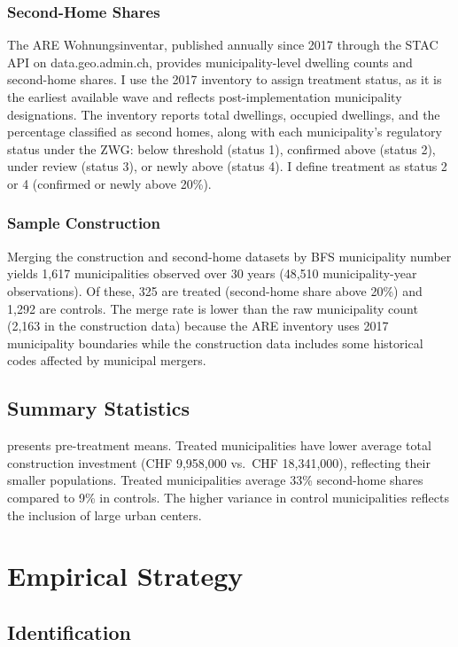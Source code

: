 \documentclass[12pt]{article}
\begin{document}
\subsubsection*{Second-Home Shares} The ARE Wohnungsinventar, published annually since 2017 through the STAC API on data.geo.admin.ch, provides municipality-level dwelling counts and second-home shares. I use the 2017 inventory to assign treatment status, as it is the earliest available wave and reflects post-implementation municipality designations. The inventory reports total dwellings, occupied dwellings, and the percentage classified as second homes, along with each municipality's regulatory status under the ZWG: below threshold (status 1), confirmed above (status 2), under review (status 3), or newly above (status 4). I define treatment as status 2 or 4 (confirmed or newly above 20\%).

\subsubsection*{Sample Construction} Merging the construction and second-home datasets by BFS municipality number yields 1,617 municipalities observed over 30 years (48,510 municipality-year observations). Of these, 325 are treated (second-home share above 20\%) and 1,292 are controls. The merge rate is lower than the raw municipality count (2,163 in the construction data) because the ARE inventory uses 2017 municipality boundaries while the construction data includes some historical codes affected by municipal mergers.

\subsection{Summary Statistics}



 presents pre-treatment means. Treated municipalities have lower average total construction investment (CHF 9,958,000 vs.\ CHF 18,341,000), reflecting their smaller populations. Treated municipalities average 33\% second-home shares compared to 9\% in controls. The higher variance in control municipalities reflects the inclusion of large urban centers.

\section{Empirical Strategy}

\subsection{Identification}
\end{document}
